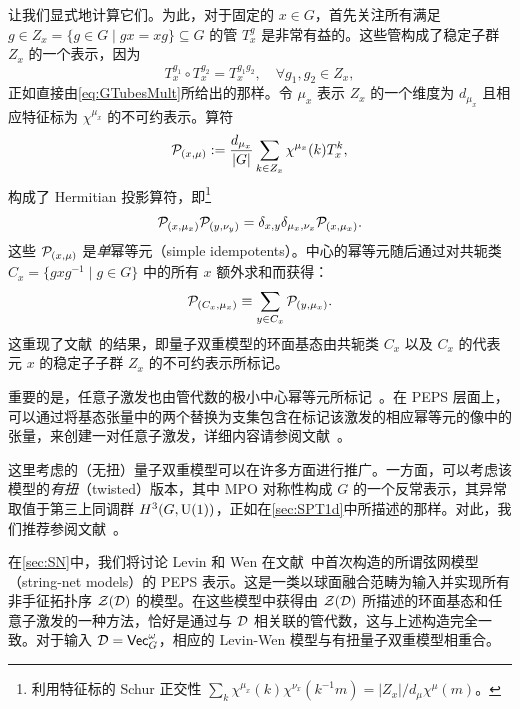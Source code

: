 让我们显式地计算它们。为此，对于固定的 $x\in G$，首先关注所有满足 $g\in Z_x=\{g\in G \mid gx=xg\}\subseteq G$ 的管 $T_x^g$ 是非常有益的。这些管构成了稳定子群 $Z_x$ 的一个表示，因为
\begin{equation}
    T^{g_1}_x\circ T^{g_2}_x = T^{g_1g_2}_x, \quad \forall g_1,g_2\in Z_x,
\end{equation}
正如直接由\cref{eq:GTubesMult}所给出的那样。令 $\mu_x$ 表示 $Z_x$ 的一个维度为 $d_{\mu_x}$ 且相应特征标为 $\chi^{\mu_x}$ 的不可约表示。算符
\begin{equation}
    \mathcal P_{(x,\mu)} := \frac{d_{\mu_x}}{\lvert G \rvert} \sum_{k\in Z_x} \chi^{\mu_x}(k) T_x^k,
\end{equation}
构成了 Hermitian 投影算符，即\footnote{利用特征标的 Schur 正交性 $\sum_k \chi^{\mu_x}(k)\chi^{\nu_x}(k^{-1}m) = \lvert Z_x \rvert/d_\mu \chi^\mu(m)$。}
\begin{equation}
    \mathcal P_{(x,\mu_x)} \mathcal P_{(y,\nu_y)} = \delta_{x,y}\delta_{\mu_x,\nu_x} \mathcal P_{(x,\mu_x)}.
\end{equation}
这些 $\mathcal P_{(x,\mu)}$ 是\emph{单}幂等元（simple idempotents）。中心的幂等元随后通过对共轭类 $C_x = \{gxg^{-1} \mid g\in G\}$ 中的所有 $x$ 额外求和而获得：
\begin{equation}
    \mathcal P_{(C_x,\mu_x)} \equiv \sum_{y\in C_x} \mathcal P_{(y,\mu_x)}.
\end{equation}
这重现了文献~\cite{Kitaev2005a}的结果，即量子双重模型的环面基态由共轭类 $C_x$ 以及 $C_x$ 的代表元 $x$ 的稳定子子群 $Z_x$ 的不可约表示所标记。

重要的是，任意子激发也由管代数的极小中心幂等元所标记~\cite{Lan2013,Hu2015}。在 PEPS 层面上，可以通过将基态张量中的两个替换为支集包含在标记该激发的相应幂等元的像中的张量，来创建一对任意子激发，详细内容请参阅文献~\cite{Bultinck2017}。

这里考虑的（无扭）量子双重模型可以在许多方面进行推广。一方面，可以考虑该模型的\emph{有扭}（twisted）版本，其中 MPO 对称性构成 $G$ 的一个反常表示，其异常取值于第三上同调群 $H^3(G,{\rm U}(1))$，正如在\cref{sec:SPT1d}中所描述的那样。对此，我们推荐参阅文献~\cite{Buerschaper2013,Bultinck2016,Williamson2017}。

在\cref{sec:SN}中，我们将讨论 Levin 和 Wen 在文献~\cite{Levin2004}中首次构造的所谓弦网模型（string-net models）的 PEPS 表示。这是一类以球面融合范畴为输入并实现所有非手征拓扑序 $\mathcal Z(\mathcal D)$ 的模型。在这些模型中获得由 $\mathcal Z(\mathcal D)$ 所描述的环面基态和任意子激发的一种方法，恰好是通过与 $\mathcal D$ 相关联的管代数，这与上述构造完全一致。对于输入 $\mathcal D=\mathsf{Vec}_G^\omega$，相应的 Levin-Wen 模型与有扭量子双重模型相重合。
